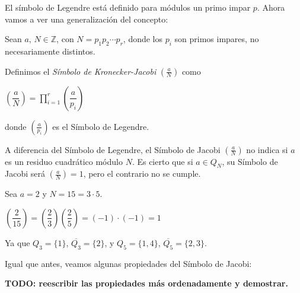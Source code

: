 
El símbolo de Legendre está definido para módulos un primo impar $p$. Ahora vamos a ver una generalización del concepto:

\begin{definition}
	Sean $a,\,N\in \mathbb{Z}$, con $N = p_1 p_2 \cdots p_r$, donde los $p_i$ son primos impares, no necesariamente distintos.
	
	Definimos el \textit{Símbolo de Kronecker-Jacobi} $\left( \frac{a}{N} \right) $ como
		\begin{center}
			$
			\left( \dfrac{a}{N} \right) = \prod_{i=1}^{r} \left( \dfrac{a}{p_i} \right)
			$
		\end{center}
		
	donde $\left( \frac{a}{p_i} \right)$ es el Símbolo de Legendre.
	 
\end{definition}

\begin{remark}
	A diferencia del Símbolo de Legendre, el Símbolo de Jacobi $\left( \frac{a}{N} \right) $ no indica si $a$ es un residuo cuadrático módulo $N$. Es cierto que si $a \in Q_N$, su Símbolo de Jacobi será $\left( \frac{a}{N} \right) = 1$, pero el contrario no se cumple.
\end{remark}

\begin{example}
	Sea $a=2$ y $N=15=3\cdot 5$.
	\begin{center}
		$\left( \dfrac{2}{15} \right) = \left( \dfrac{2}{3} \right) \left( \dfrac{2}{5} \right) =  \left(-1\right) \cdot  \left(-1\right) = 1$
	\end{center}
	Ya que $Q_3 = \{1\}$, $\overline{Q_3}=\{2\}$, y $Q_5 = \{1,4\}$, $\overline{Q_5}=\{2,3\}$.
\end{example}

\hfil

Igual que antes, veamos algunas propiedades del Símbolo de Jacobi:

\textbf{TODO: reescribir las propiedades más ordenadamente y demostrar.}

